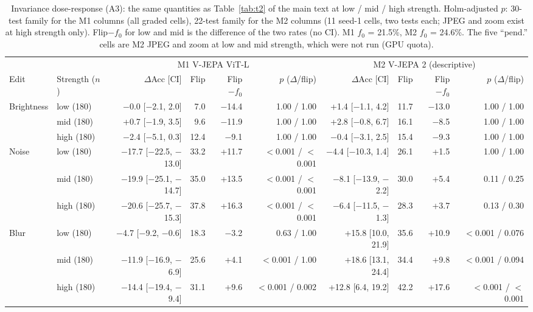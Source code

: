 \begin{table}[t]
\caption{Invariance dose-response (A3): the same quantities as Table~\ref{tab:t2} of the main text at low / mid / high strength. Holm-adjusted $p$: 30-test family for the M1 columns (all graded cells), 22-test family for the M2 columns (11 seed-1 cells, two tests each; JPEG and zoom exist at high strength only). Flip$-f_0$ for low and mid is the difference of the two rates (no CI). M1 $f_0$ = 21.5\%, M2 $f_0$ = 24.6\%. The five ``pend.'' cells are M2 JPEG and zoom at low and mid strength, which were not run (GPU quota).}
\label{tab:t2b}
\centering\scriptsize
\setlength{\tabcolsep}{1.9pt}
\begin{tabular}{@{}llrrrrrrrr@{}}
\toprule
 & & \multicolumn{4}{c}{M1 V-JEPA ViT-L} & \multicolumn{4}{c}{M2 V-JEPA 2 (descriptive)} \\
\cmidrule(lr){3-6}\cmidrule(lr){7-10}
Edit & Strength ($n$) & $\Delta$Acc [CI] & Flip & Flip$-f_0$ & $p$ ($\Delta$/flip) & $\Delta$Acc [CI] & Flip & Flip$-f_0$ & $p$ ($\Delta$/flip) \\
\midrule
Brightness & low (180) & $-$0.0 [$-$2.1, 2.0] & 7.0 & $-$14.4 & 1.00 / 1.00 & +1.4 [$-$1.1, 4.2] & 11.7 & $-$13.0 & 1.00 / 1.00 \\
 & mid (180) & +0.7 [$-$1.9, 3.5] & 9.6 & $-$11.9 & 1.00 / 1.00 & +2.8 [$-$0.8, 6.7] & 16.1 & $-$8.5 & 1.00 / 1.00 \\
 & high (180) & $-$2.4 [$-$5.1, 0.3] & 12.4 & $-$9.1 & 1.00 / 1.00 & $-$0.4 [$-$3.1, 2.5] & 15.4 & $-$9.3 & 1.00 / 1.00 \\
\addlinespace[1pt]
Noise & low (180) & $-$17.7 [$-$22.5, $-$13.0] & 33.2 & +11.7 & $<$0.001 / $<$0.001 & $-$4.4 [$-$10.3, 1.4] & 26.1 & +1.5 & 1.00 / 1.00 \\
 & mid (180) & $-$19.9 [$-$25.1, $-$14.7] & 35.0 & +13.5 & $<$0.001 / $<$0.001 & $-$8.1 [$-$13.9, $-$2.2] & 30.0 & +5.4 & 0.11 / 0.25 \\
 & high (180) & $-$20.6 [$-$25.7, $-$15.3] & 37.8 & +16.3 & $<$0.001 / $<$0.001 & $-$6.4 [$-$11.5, $-$1.3] & 28.3 & +3.7 & 0.13 / 0.30 \\
\addlinespace[1pt]
Blur & low (180) & $-$4.7 [$-$9.2, $-$0.6] & 18.3 & $-$3.2 & 0.63 / 1.00 & +15.8 [10.0, 21.9] & 35.6 & +10.9 & $<$0.001 / 0.076 \\
 & mid (180) & $-$11.9 [$-$16.9, $-$6.9] & 25.6 & +4.1 & $<$0.001 / 1.00 & +18.6 [13.1, 24.4] & 34.4 & +9.8 & $<$0.001 / 0.094 \\
 & high (180) & $-$14.4 [$-$19.4, $-$9.4] & 31.1 & +9.6 & $<$0.001 / 0.002 & +12.8 [6.4, 19.2] & 42.2 & +17.6 & $<$0.001 / $<$0.001 \\

\end{tabular}
\end{table}
